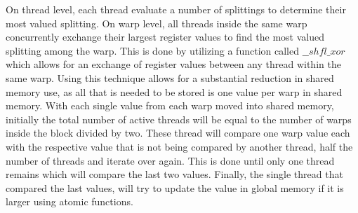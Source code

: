 \documentclass{aamas2012}
\begin{document}
On thread level, each thread evaluate a number of splittings to determine their most valued splitting. 
On warp level, all threads inside the same warp concurrently exchange their largest register values to find the most valued splitting among the warp.
This is done by utilizing a function called $\_\_shfl\_xor$ which allows for an exchange of register values between any thread within the same warp.
Using this technique allows for a substantial reduction in shared memory use, as all that is needed to be stored is one value per warp in shared memory. 
With each single value from each warp moved into shared memory, initially the total number of active threads will be equal to the number
of warps inside the block divided by two. These thread will compare one warp value each with the respective value that is not being compared by
another thread, half the number of threads and iterate over again. This is done until only one thread remains which will compare the last two values.
Finally, the single thread that compared the last values, will try to update the value in global memory if it is larger using atomic functions.
\end{document}
